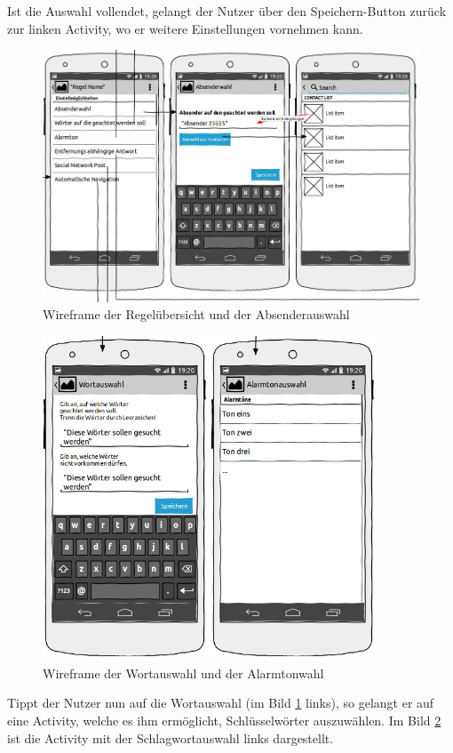 Ist die Auswahl vollendet, gelangt der Nutzer \"uber den Speichern-Button zur\"uck zur linken Activity, wo er weitere Einstellungen vornehmen kann.
\begin{figure}[!ht]
\centering
\includegraphics[width=16cm]{Bilder/WireframeRegeluebersicht.png}
\caption{Wireframe der Regel\"ubersicht und der Absenderauswahl}
\label{Wireframe Regeluebersicht}
\centering
\end{figure}

\newpage

 
\begin{figure}
\vspace{-13pt}
\includegraphics[width=10cm]{Bilder/WireframeWortwahl.png}
\caption{Wireframe der Wortauswahl und der Alarmtonwahl}
\label{Wireframe Wortauswahl}
\vspace{-20pt}
\end{figure}
Tippt der Nutzer nun auf die Wortauswahl (im Bild \ref{Wireframe Regeluebersicht} links), so gelangt er auf eine Activity, welche es ihm erm\"oglicht, Schl\"usselw\"orter auszuw\"ahlen. Im Bild \ref{Wireframe Wortauswahl} ist die Activity mit der Schlagwortauswahl links dargestellt. 


